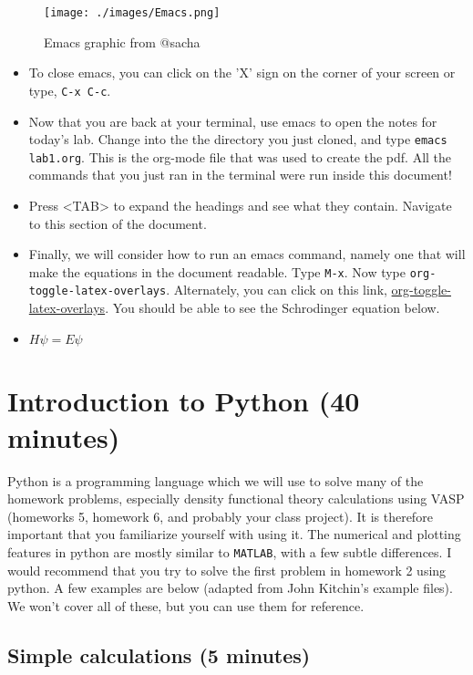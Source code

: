 \documentclass[11pt]{article}
\begin{document}
\begin{figure}[htb]
\centering
\texttt{[image: ./images/Emacs.png]}
\caption{Emacs graphic from @sacha}
\end{figure}

\begin{itemize}
\item To close emacs, you can click on the 'X' sign on the corner of your screen or type, \verb~C-x C-c~.

\item Now that you are back at your terminal, use emacs to open the notes for today's lab. Change into the the directory you just cloned, and type \verb~emacs lab1.org~. This is the org-mode file that was used to create the pdf. All the commands that you just ran in the terminal were run inside this document!

\item Press <TAB> to expand the headings and see what they contain. Navigate to this section of the document.

\item Finally, we will consider how to run an emacs command, namely one that will make the equations in the document readable. Type \verb~M-x~. Now type \verb~org-toggle-latex-overlays~. Alternately, you can click on this link, \url{org-toggle-latex-overlays}. You should be able to see the Schrodinger equation below.

\item $H\psi = E\psi$
\end{itemize}



\section{Introduction to Python (40 minutes)}
\label{sec-3}

Python is a programming language which we will use to solve many of the homework problems, especially density functional theory calculations using VASP (homeworks 5, homework 6, and probably your class project). It is therefore important that you familiarize yourself with using it. The numerical and plotting features in python are mostly similar to \texttt{MATLAB}, with a few subtle differences. I would recommend that you try to solve the first problem in homework 2 using python. A few examples are below (adapted from John Kitchin's example files). We won't cover all of these, but you can use them for reference.

\subsection{Simple calculations (5 minutes)}
\label{sec-3-1}
\end{document}
